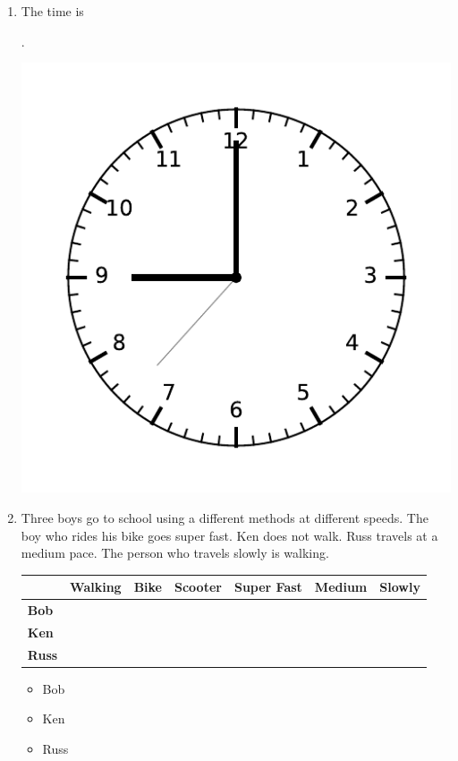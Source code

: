 \documentclass{tufte-book}
\providecommand{\tabularnewline}{\\}
\begin{document}
\begin{enumerate}
  \item The time is \dotfill\bigskip\par\dotfill\bigskip.
  \begin{marginfigure}\includegraphics[width=\textwidth]{maths/fig/clock_0900.pdf}\end{marginfigure}

  \item Three boys go to school using a different methods at different speeds.
  The boy who rides his bike goes super fast. Ken does not walk.
  Russ travels at a medium pace. The person who travels slowly is walking.\par
  \begin{tabular}{|l|>{\centering}p{2cm}|>{\centering}p{2cm}|>{\centering}p{2cm}|>{\centering}p{2cm}|>{\centering}p{2cm}|>{\centering}p{2cm}|}
  \hline 
    & \textbf{Walking} & \textbf{Bike} & \textbf{Scooter} & \textbf{Super Fast} & \textbf{Medium} & \textbf{Slowly}\tabularnewline
  \hline 
  \textbf{Bob} &  &  &  &  &  & \tabularnewline
  \hline 
  \textbf{Ken} &  &  &  &  &  & \tabularnewline
  \hline 
  \textbf{Russ} &  &  &  &  &  & \tabularnewline
  \hline 
  \end{tabular}
  \bigskip
  \begin{itemize}
    \item Bob \dotfill\bigskip
    \item Ken \dotfill\bigskip
    \item Russ \dotfill
  \end{itemize}

\end{enumerate}
\end{document}
